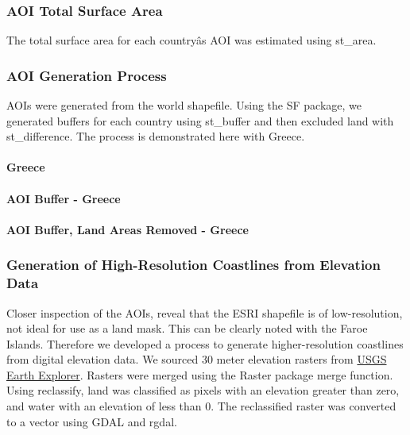 \documentclass[]{article}
\let\oldparagraph\paragraph
\renewcommand{\paragraph}[1]{\oldparagraph{#1}\mbox{}}
\begin{document}
\subsubsection{AOI Total Surface Area}\label{aoi-total-surface-area}

The total surface area for each countryâs AOI was estimated using
st\_area.

\subsubsection{AOI Generation Process}\label{aoi-generation-process}

AOIs were generated from the world shapefile. Using the SF package, we
generated buffers for each country using st\_buffer and then excluded
land with st\_difference. The process is demonstrated here with Greece.

\paragraph{Greece}\label{greece}

\paragraph{AOI Buffer - Greece}\label{aoi-buffer---greece}

\paragraph{AOI Buffer, Land Areas Removed -
Greece}\label{aoi-buffer-land-areas-removed---greece}

\subsubsection{Generation of High-Resolution Coastlines from Elevation
Data}\label{generation-of-high-resolution-coastlines-from-elevation-data}

Closer inspection of the AOIs, reveal that the ESRI shapefile is of
low-resolution, not ideal for use as a land mask. This can be clearly
noted with the Faroe Islands. Therefore we developed a process to
generate higher-resolution coastlines from digital elevation data. We
sourced 30 meter elevation rasters from
\href{https://earthexplorer.usgs.gov/}{USGS Earth Explorer}. Rasters
were merged using the Raster package merge function. Using reclassify,
land was classified as pixels with an elevation greater than zero, and
water with an elevation of less than 0. The reclassified raster was
converted to a vector using GDAL and rgdal.
\end{document}
